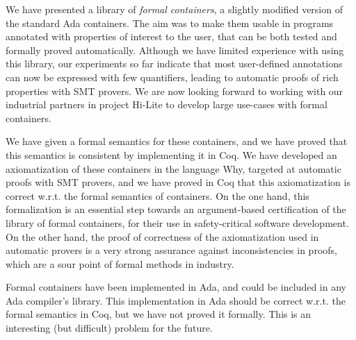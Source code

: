 \documentclass[runningheads,a4paper]{llncs}
\newcommand{\wrt}{w.r.t.\xspace}
\newcommand{\beforesec}{\vspace{-0.2cm}}
\begin{document}
We have presented a library of \textit{formal containers}, a slightly modified
version of the standard Ada containers. The aim was to make them usable in
programs annotated with properties of interest to the user, that can be both
tested and formally proved automatically.  Although we have limited experience
with using this library, our experiments so far indicate that most user-defined
annotations can now be expressed with few quantifiers, leading to automatic proofs of
rich properties with SMT provers. We are now looking forward to working
with our industrial partners in project Hi-Lite to develop large use-cases with
formal containers.

We have given a formal semantics for these containers, and we have proved that
this semantics is consistent by implementing it in Coq. We have developed an
axiomatization of these containers in the language Why, targeted at automatic
proofs with SMT provers, and we have proved in Coq that this axiomatization is
correct \wrt the formal semantics of containers. On the one hand, this
formalization is an essential step towards an argument-based certification of
the library of formal containers, for their use in safety-critical software
development. On the other hand, the proof of correctness of the axiomatization
used in automatic provers is a very strong assurance against inconsistencies in
proofs, which are a sour point of formal methods in industry.

Formal containers have been implemented in Ada, and could be included in any Ada
compiler's library.
This implementation in Ada should be correct \wrt the formal
semantics in Coq, but we have not proved it formally. This is an interesting
(but difficult) problem for the future.

\beforesec




\end{document}
